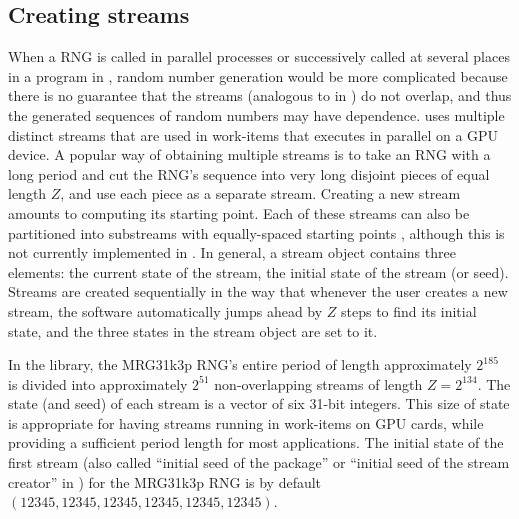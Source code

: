 \documentclass[article,nojss]{jss}\usepackage[]{graphicx}\usepackage[]{color}
\begin{document}
\subsection{Creating streams}\label{createstreams}
When a RNG is called in parallel processes or successively called at several places in a program in , random number generation would be more complicated because there is no guarantee that the streams (analogous to  in ) do not overlap, and thus the generated sequences of random numbers may have dependence.  uses multiple distinct streams that are used in work-items that executes in parallel on a GPU device. A popular way of obtaining multiple streams is to take an RNG with a long period and cut the RNG's sequence into very long disjoint pieces of equal length $Z$, and use each piece as a separate stream. Creating a new stream amounts to computing its starting point. Each of these streams can also be partitioned into substreams with equally-spaced starting points \citep{l2002object, rLEC15a}, although this is not currently implemented in . In general, a stream object contains three elements: the current state of the stream, the initial state of the stream (or seed). Streams are created sequentially in the way that whenever the user creates a new stream, the software automatically jumps ahead by $Z$ steps to find its initial state, and the three states in the stream object are set to it. 


In the  library, the MRG31k3p RNG's entire period of length approximately $2^{185}$ is divided into approximately $2^{51}$ non-overlapping streams of length $Z = 2^{134}$. %
The state (and seed) of each stream is a vector of six 31-bit integers. This size of state is appropriate for having streams running in work-items on GPU cards, while providing a sufficient period length for most applications. The initial state of the first stream (also called ``initial seed of the package'' or ``initial seed of the stream creator'' in ) for the MRG31k3p RNG is by default $(12345, 12345, 12345, 12345, 12345, 12345)$. 
\end{document}
